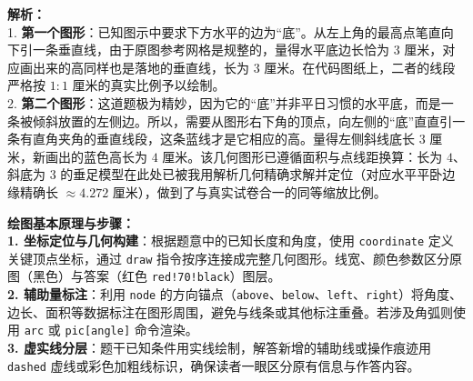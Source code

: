 \begin{center}
\end{center}

\vspace{0.6cm}
{\small\color{gray}
\textbf{解析：}\\
1. \textbf{第一个图形}：已知图示中要求下方水平的边为“底”。从左上角的最高点笔直向下引一条垂直线，由于原图参考网格是规整的，量得水平底边长恰为 $3$ 厘米，对应画出来的高同样也是落地的垂直线，长为 $3$ 厘米。在代码图纸上，二者的线段严格按 $1:1$ 厘米的真实比例予以绘制。\\
2. \textbf{第二个图形}：这道题极为精妙，因为它的“底”并非平日习惯的水平底，而是一条被倾斜放置的左侧边。所以，需要从图形右下角的顶点，向左侧的“底”直直引一条有直角夹角的垂直线段，这条蓝线才是它相应的高。量得左侧斜线底长 $3$ 厘米，新画出的蓝色高长为 $4$ 厘米。该几何图形已遵循面积与点线距换算：长为 $4$、斜底为 $3$ 的垂足模型在此处已被我用解析几何精确求解并定位（对应水平平卧边缘精确长 $\approx 4.272$ 厘米），做到了与真实试卷合一的同等缩放比例。
}


\vspace{0.6cm}

{\small\color{blue!70!black}
\textbf{绘图基本原理与步骤：}\\
\textbf{1. 坐标定位与几何构建}：根据题意中的已知长度和角度，使用 \texttt{coordinate} 定义关键顶点坐标，通过 \texttt{draw} 指令按序连接成完整几何图形。线宽、颜色参数区分原图（黑色）与答案（红色 \texttt{red!70!black}）图层。\\
\textbf{2. 辅助量标注}：利用 \texttt{node} 的方向锚点（\texttt{above}、\texttt{below}、\texttt{left}、\texttt{right}）将角度、边长、面积等数据标注在图形周围，避免与线条或其他标注重叠。若涉及角弧则使用 \texttt{arc} 或 \texttt{pic[angle]} 命令渲染。\\
\textbf{3. 虚实线分层}：题干已知条件用实线绘制，解答新增的辅助线或操作痕迹用 \texttt{dashed} 虚线或彩色加粗线标识，确保读者一眼区分原有信息与作答内容。
}



